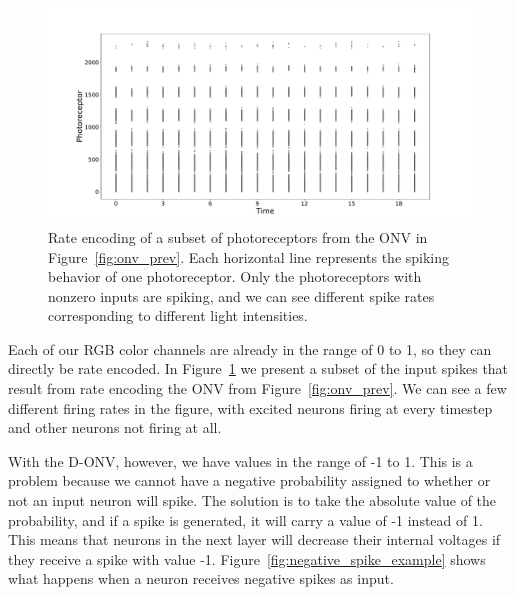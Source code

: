 \documentclass [MS] {UCLAthesis}
\begin{document}
\begin{figure}
    \centering
    \includegraphics[width=1.0\textwidth]{onv_rate_prev}
    \caption[Rate encoded ONV]{Rate encoding of a subset of photoreceptors from the ONV in Figure~\ref{fig:onv_prev}. Each horizontal line represents the spiking behavior of one photoreceptor. Only the photoreceptors with nonzero inputs are spiking, and we can see different spike rates corresponding to different light intensities.}
    \label{fig:onv_encode_rate}
\end{figure}

Each of our RGB color channels are already in the range of 0 to 1, so they can directly be rate encoded. In Figure~\ref{fig:onv_encode_rate} we present a subset of the input spikes that result from rate encoding the ONV from Figure~\ref{fig:onv_prev}. We can see a few different firing rates in the figure, with excited neurons firing at every timestep and other neurons not firing at all.

With the D-ONV, however, we have values in the range of -1 to 1. This is a problem because we cannot have a negative probability assigned to whether or not an input neuron will spike. The solution is to take the absolute value of the probability, and if a spike is generated, it will carry a value of -1 instead of 1. This means that neurons in the next layer will decrease their internal voltages if they receive a spike with value -1. Figure~\ref{fig:negative_spike_example} shows what happens when a neuron receives negative spikes as input.
\end{document}
